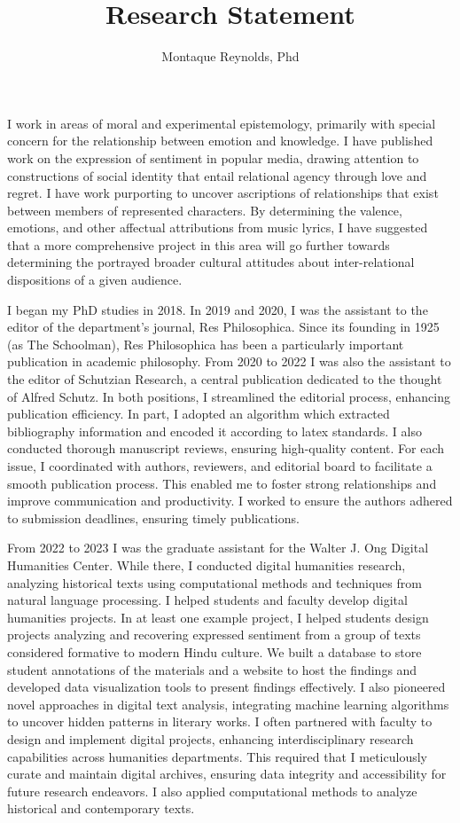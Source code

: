 \documentclass[
  letterpaper,
  DIV=11,
  numbers=noendperiod]{scrartcl}
\title{Research Statement}
\author{Montaque Reynolds, Phd}
\date{}
\begin{document}
\maketitle


I work in areas of moral and experimental epistemology, primarily with
special concern for the relationship between emotion and knowledge. I
have published work on the expression of sentiment in popular media,
drawing attention to constructions of social identity that entail
relational agency through love and regret. I have work purporting to
uncover ascriptions of relationships that exist between members of
represented characters. By determining the valence, emotions, and other
affectual attributions from music lyrics, I have suggested that a more
comprehensive project in this area will go further towards determining
the portrayed broader cultural attitudes about inter-relational
dispositions of a given audience.

I began my PhD studies in 2018. In 2019 and 2020, I was the assistant to
the editor of the department's journal, Res Philosophica. Since its
founding in 1925 (as The Schoolman), Res Philosophica has been a
particularly important publication in academic philosophy. From 2020 to
2022 I was also the assistant to the editor of Schutzian Research, a
central publication dedicated to the thought of Alfred Schutz. In both
positions, I streamlined the editorial process, enhancing publication
efficiency. In part, I adopted an algorithm which extracted bibliography
information and encoded it according to latex standards. I also
conducted thorough manuscript reviews, ensuring high-quality content.
For each issue, I coordinated with authors, reviewers, and editorial
board to facilitate a smooth publication process. This enabled me to
foster strong relationships and improve communication and productivity.
I worked to ensure the authors adhered to submission deadlines, ensuring
timely publications.

From 2022 to 2023 I was the graduate assistant for the Walter J. Ong
Digital Humanities Center. While there, I conducted digital humanities
research, analyzing historical texts using computational methods and
techniques from natural language processing. I helped students and
faculty develop digital humanities projects. In at least one example
project, I helped students design projects analyzing and recovering
expressed sentiment from a group of texts considered formative to modern
Hindu culture. We built a database to store student annotations of the
materials and a website to host the findings and developed data
visualization tools to present findings effectively. I also pioneered
novel approaches in digital text analysis, integrating machine learning
algorithms to uncover hidden patterns in literary works. I often
partnered with faculty to design and implement digital projects,
enhancing interdisciplinary research capabilities across humanities
departments. This required that I meticulously curate and maintain
digital archives, ensuring data integrity and accessibility for future
research endeavors. I also applied computational methods to analyze
historical and contemporary texts.
\end{document}
